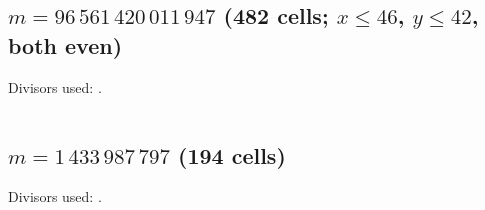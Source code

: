 \documentclass[11pt,a4paper]{article}
\theoremstyle{definition}\newtheorem{definition}[theorem]{Definition}
\theoremstyle{remark}\newtheorem{remark}[theorem]{Remark}
\begin{document}
\subsection*{$m=96\,561\,420\,011\,947$ \quad (482 cells; $x\le 46$, $y\le 42$, both even)}
Divisors used: .
\begin{longtable}{@{}llllll@{}}\end{longtable}
\subsection*{$m=1\,433\,987\,797$ \quad (194 cells)}
Divisors used: .
\begin{longtable}{@{}llllll@{}}\end{longtable}
\end{document}
